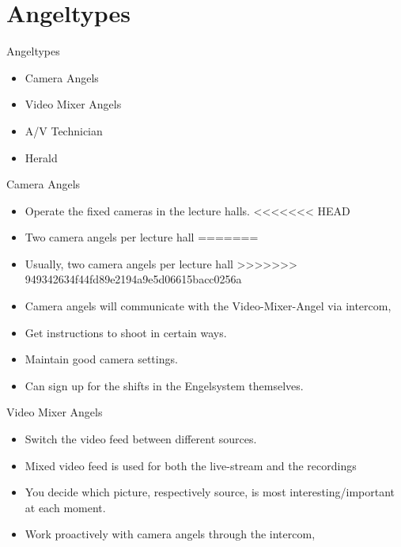 \documentclass[aspectratio=169]{beamer}
\begin{document}
\section{Angeltypes}
\begin{frame}{Angeltypes}
	\begin{itemize}
		\item Camera Angels
		\item Video Mixer Angels
		\item A/V Technician
		\item Herald
	\end{itemize}
\end{frame}

\begin{frame}{Camera Angels}
	\begin{itemize}
		\item Operate the fixed cameras in the lecture halls. 
<<<<<<< HEAD
		\item Two camera angels per lecture hall 
=======
		\item Usually, two camera angels per lecture hall 
>>>>>>> 949342634f44fd89e2194a9e5d06615bacc0256a
		\item Camera angels will communicate with the Video-Mixer-Angel via intercom,
		\item Get instructions to shoot in certain ways. 
		\item Maintain good camera settings.
		\item Can sign up for the shifts in the Engelsystem themselves.
	\end{itemize}
\end{frame}

\begin{frame}{Video Mixer Angels}
	\begin{itemize}
		\item Switch the video feed between different sources. 
		\item Mixed video feed is used for both the live-stream and the recordings 
		\item You decide which picture, respectively source, is most interesting/important at each moment.
		\item Work proactively with camera angels through the intercom, 
	\end{itemize}
\end{frame}
\end{document}
